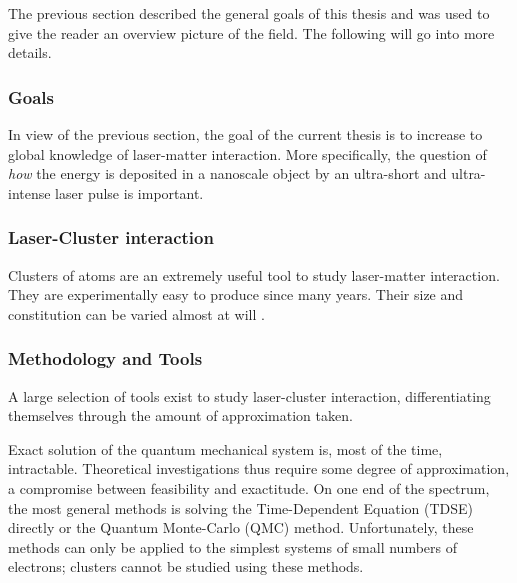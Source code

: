 
The previous section described the general goals of this thesis and was used to
give the reader an overview picture of the field. The following will go
into more details.

\subsubsection{Goals}
In view of the previous section, the goal of the current thesis is to increase
to global knowledge of laser-matter interaction. More specifically, the
question of \textit{how} the energy is deposited in a nanoscale object by an
ultra-short and ultra-intense laser pulse is important.

\cite{Young2010,Chapman2011}

\subsubsection{Laser-Cluster interaction}


\label{section:intro:clusters:clusters}

Clusters of atoms are an extremely useful tool to study laser-matter
interaction. They are experimentally easy to produce since many
years\cite{Haberland1994}. Their size and constitution can be varied almost at
will \cite{Martin1996}.

\cite{Fennel2010}

\label{section:intro:clusters:heating}



\subsubsection{Methodology and Tools}
A large selection of tools exist to study laser-cluster interaction,
differentiating themselves through the amount of approximation taken.

Exact solution of the quantum mechanical system is, most of the time,
intractable. Theoretical investigations thus require some degree of
approximation, a compromise between feasibility and exactitude. On one end of
the spectrum, the most general methods is solving the
Time-Dependent \schrodinger Equation (TDSE) directly or the Quantum Monte-Carlo
(QMC) method. Unfortunately, these methods can only be applied to the simplest
systems of small numbers of electrons; clusters cannot be studied using these
methods.


